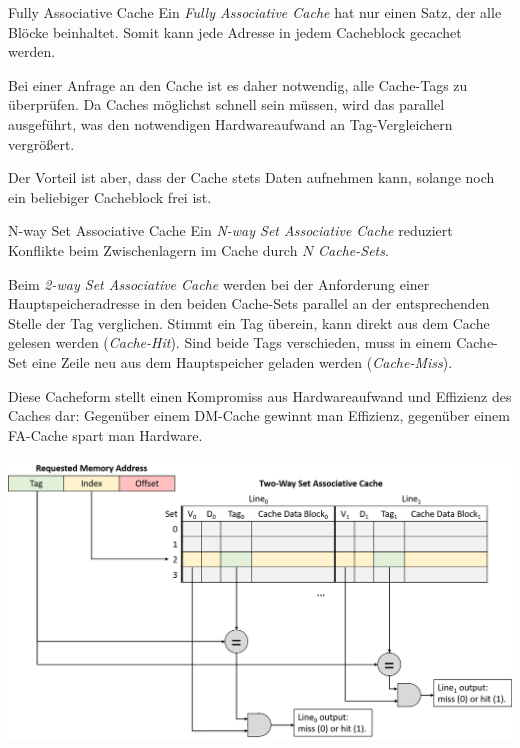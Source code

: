 \begin{defi}{Fully Associative Cache}
    Ein \emph{Fully Associative Cache} hat nur einen Satz, der alle Blöcke beinhaltet.
    Somit kann jede Adresse in jedem Cacheblock gecachet werden.

    Bei einer Anfrage an den Cache ist es daher notwendig, alle Cache-Tags zu überprüfen.
    Da Caches möglichst schnell sein müssen, wird das parallel ausgeführt, was den notwendigen Hardwareaufwand an Tag-Vergleichern vergrößert.

    Der Vorteil ist aber, dass der Cache stets Daten aufnehmen kann, solange noch ein beliebiger Cacheblock frei ist.
\end{defi}

\begin{defi}{N-way Set Associative Cache}
    Ein \emph{N-way Set Associative Cache} reduziert Konflikte beim Zwischenlagern im Cache durch $N$ \emph{Cache-Sets}.

    Beim \emph{2-way Set Associative Cache} werden bei der Anforderung einer Hauptspeicheradresse in den beiden Cache-Sets parallel an der entsprechenden Stelle der Tag verglichen.
    Stimmt ein Tag überein, kann direkt aus dem Cache gelesen werden (\emph{Cache-Hit}).
    Sind beide Tags verschieden, muss in einem Cache-Set eine Zeile neu aus dem Hauptspeicher geladen werden (\emph{Cache-Miss}).

    Diese Cacheform stellt einen Kompromiss aus Hardwareaufwand und Effizienz des Caches dar:
    Gegenüber einem DM-Cache gewinnt man Effizienz, gegenüber einem FA-Cache spart man Hardware.

    \centering
    \includegraphics[width=.9\linewidth]{images/2-way_set_associative_cache_request.png}
\end{defi}

